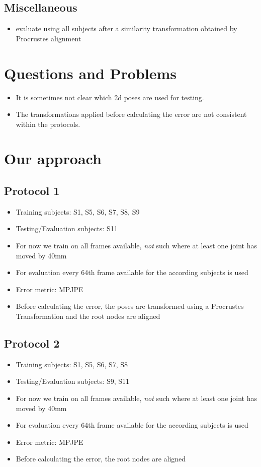 \documentclass[11pt]{article}
\begin{document}
	\subsection{Miscellaneous}
	\begin{itemize}
		\item \cite{jahangiri17} evaluate using all subjects after a similarity transformation obtained by Procrustes alignment
	\end{itemize}
	
	\section{Questions and Problems}
	\begin{itemize}
		\item It is sometimes not clear which 2d poses are used for testing.
		\item The transformations applied before calculating the error are not consistent within the protocols.
	\end{itemize}
	
	
	\section{Our approach}
		\subsection{Protocol 1}
			\begin{itemize}
				\item Training subjects: S1, S5, S6, S7, S8, S9
				\item Testing/Evaluation subjects: S11
				\item For now we train on all frames available, \emph{not} such where at least one joint has moved by 40mm
				\item For evaluation every 64th frame available for the according subjects is used
				\item Error metric: MPJPE
				\item Before calculating the error, the poses are transformed using a Procrustes Transformation and the root nodes are aligned
			\end{itemize}
		\subsection{Protocol 2}
			\begin{itemize}
				\item Training subjects: S1, S5, S6, S7, S8
				\item Testing/Evaluation subjects: S9, S11
				\item For now we train on all frames available, \emph{not} such where at least one joint has moved by 40mm
				\item For evaluation every 64th frame available for the according subjects is used
				\item Error metric: MPJPE
				\item Before calculating the error, the root nodes are aligned
			\end{itemize}
	
  
  
  
\end{document}
